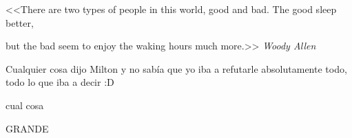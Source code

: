 \documentclass[a5paper, 12pt]{article}
\begin{document}
	
	
	\begin{center}
		<<There are two types of people in this world, good and bad. The good sleep better,
		
		but the bad
         seem to enjoy the waking hours much more.>>
		\emph{Woody Allen}
\end{center}	
	
	
	{\tiny
	Cualquier cosa dijo                                                                                                                                                                Milton y no sabía que yo iba a refutarle absolutamente todo, todo lo que iba a decir :D}
	
	cual cosa
	
	\Huge GRANDE
	
\end{document}
